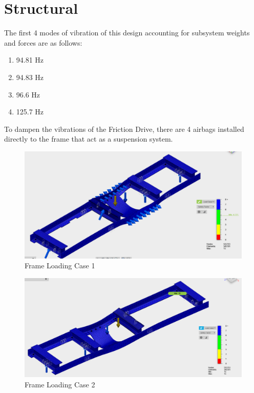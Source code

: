 \documentclass[main.tex]{subfiles}
\begin{document}
    \section{Structural}
    The first 4 modes of vibration of this design accounting for subsystem weights and forces are as follows:
    \begin{enumerate}
    	\item 94.81 Hz
    	\item 94.83 Hz
    	\item 96.6 Hz
    	\item 125.7 Hz
    \end{enumerate}
	To dampen the vibrations of the Friction Drive, there are 4 airbags installed directly to the frame that act as a suspension system.\\
    \begin{figure}
        \centering
        \includegraphics[width=\linewidth]{images/frame1}
        \caption{Frame Loading Case 1}
        \label{fig:frame1}
    \end{figure}
    \begin{figure}
        \centering
        \includegraphics[width=\linewidth]{images/frame2}
        \caption{Frame Loading Case 2}
        \label{fig:frame2}
    \end{figure}
\end{document}
